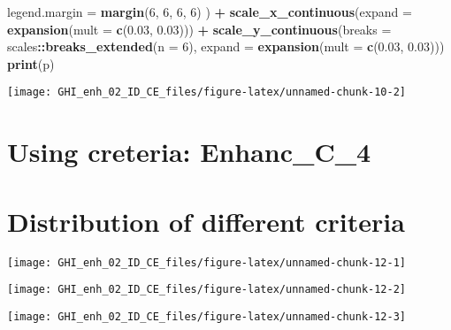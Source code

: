 \documentclass[
  10pt,
  a4paper,oneside]{article}
\newenvironment{Shaded}{\begin{snugshade}}{\end{snugshade}}
\newcommand{\AttributeTok}[1]{\textcolor[rgb]{0.13,0.29,0.53}{#1}}
\newcommand{\DecValTok}[1]{\textcolor[rgb]{0.00,0.00,0.81}{#1}}
\newcommand{\FloatTok}[1]{\textcolor[rgb]{0.00,0.00,0.81}{#1}}
\newcommand{\FunctionTok}[1]{\textcolor[rgb]{0.13,0.29,0.53}{\textbf{#1}}}
\newcommand{\NormalTok}[1]{#1}
\newcommand{\SpecialCharTok}[1]{\textcolor[rgb]{0.81,0.36,0.00}{\textbf{#1}}}
\begin{document}
\begin{Shaded}
\begin{Highlighting}[]
        \AttributeTok{legend.margin        =} \FunctionTok{margin}\NormalTok{(}\DecValTok{6}\NormalTok{, }\DecValTok{6}\NormalTok{, }\DecValTok{6}\NormalTok{, }\DecValTok{6}\NormalTok{)}
\NormalTok{    ) }\SpecialCharTok{+}
    \FunctionTok{scale\_x\_continuous}\NormalTok{(}\AttributeTok{expand =} \FunctionTok{expansion}\NormalTok{(}\AttributeTok{mult =} \FunctionTok{c}\NormalTok{(}\FloatTok{0.03}\NormalTok{, }\FloatTok{0.03}\NormalTok{))) }\SpecialCharTok{+}
    \FunctionTok{scale\_y\_continuous}\NormalTok{(}\AttributeTok{breaks =}\NormalTok{ scales}\SpecialCharTok{::}\FunctionTok{breaks\_extended}\NormalTok{(}\AttributeTok{n =} \DecValTok{6}\NormalTok{),}
                       \AttributeTok{expand =} \FunctionTok{expansion}\NormalTok{(}\AttributeTok{mult =} \FunctionTok{c}\NormalTok{(}\FloatTok{0.03}\NormalTok{, }\FloatTok{0.03}\NormalTok{)))}
\FunctionTok{print}\NormalTok{(p)}
\end{Highlighting}
\end{Shaded}

\begin{center}\texttt{[image: GHI\_enh\_02\_ID\_CE\_files/figure-latex/unnamed-chunk-10-2]} \end{center}

\FloatBarrier

\hypertarget{using-creteria-enhanc_c_4}{%
\section{Using creteria: Enhanc\_C\_4}\label{using-creteria-enhanc_c_4}}

\hypertarget{distribution-of-different-criteria}{%
\section{Distribution of different criteria}\label{distribution-of-different-criteria}}

\begin{center}\texttt{[image: GHI\_enh\_02\_ID\_CE\_files/figure-latex/unnamed-chunk-12-1]} \end{center}

\begin{center}\texttt{[image: GHI\_enh\_02\_ID\_CE\_files/figure-latex/unnamed-chunk-12-2]} \end{center}

\begin{center}\texttt{[image: GHI\_enh\_02\_ID\_CE\_files/figure-latex/unnamed-chunk-12-3]} \end{center}
\end{document}

